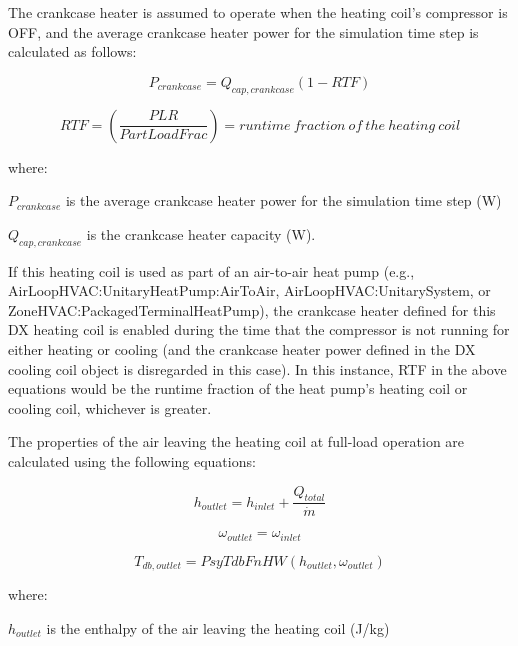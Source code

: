 The crankcase heater is assumed to operate when the heating coil's compressor is OFF, and the average crankcase heater power for the simulation time step is calculated as follows:

\begin{equation}
  {P_{crankcase}} = {Q_{cap,crankcase}}\left( {1 - RTF} \right)
\end{equation}

\begin{equation}
RTF = \left( \frac{PLR}{PartLoadFrac} \right) = runtime~fraction~of~the~heating~coil
\end{equation}

where:

\({P_{crankcase}}\) is the average crankcase heater power for the simulation time step (W)

\({Q_{cap,crankcase}}\) is the crankcase heater capacity (W).

If this heating coil is used as part of an air-to-air heat pump (e.g., AirLoopHVAC:UnitaryHeatPump:AirToAir, AirLoopHVAC:UnitarySystem, or ZoneHVAC:PackagedTerminalHeatPump), the crankcase heater defined for this DX heating coil is enabled during the time that the compressor is not running for either heating or cooling (and the crankcase heater power defined in the DX cooling coil object is disregarded in this case). In this instance, RTF in the above equations would be the runtime fraction of the heat pump's heating coil or cooling coil, whichever is greater.

The properties of the air leaving the heating coil at full-load operation are calculated using the following equations:

\begin{equation}
  h_{outlet} = h_{inlet} + \frac{Q_{total}}{\dot{m}}
 \label{eq:SSEHPDXHeatingCoilhoutlet}
\end{equation}

\begin{equation}
{\omega_{outlet}} = {\omega_{inlet}}
\label{eq:SSEHPDXHeatingCoilomegaoutlet}
\end{equation}

\begin{equation}
{T_{db,outlet}} = PsyTdbFnHW({h_{outlet}},{\omega_{outlet}})
\label{eq:SSEHPDXHeatingCoilTdboutlet}
\end{equation}

where:

\({h_{outlet}}\) is the enthalpy of the air leaving the heating coil (J/kg)

